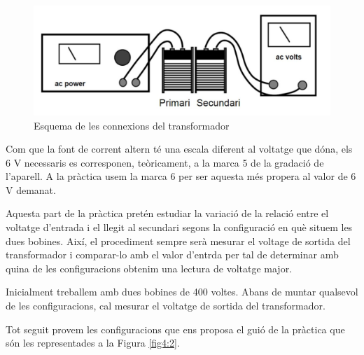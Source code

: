 \documentclass[a4paper,10.5pt]{report}
\begin{document}
\begin{figure}[h]
	\centering
	\includegraphics[width=0.38\linewidth]{screenshot007}
	\caption{Esquema de les connexions del transformador}
	\label{fig4:1}
\end{figure}

Com que la font de corrent altern té una escala diferent al voltatge que dóna, els 6 V necessaris es corresponen, teòricament, a la marca 5 de la gradació de l'aparell. A la pràctica usem la marca 6 per ser aquesta més propera al valor de 6 V demanat.

Aquesta part de la pràctica pretén estudiar la variació de la relació entre el voltatge d'entrada i el llegit al secundari segons la configuració en què situem les dues bobines. Així, el procediment sempre serà mesurar el voltage de sortida del transformador i comparar-lo amb el valor d'entrda per tal de determinar amb quina de les configuracions obtenim una lectura de voltatge major.

Inicialment treballem amb dues bobines de 400 voltes. Abans de muntar qualsevol de les configuracions, cal mesurar el voltatge de sortida del transformador.

Tot seguit provem les configuracions que ens proposa el guió de la pràctica que són les representades a la Figura \ref{fig4:2}.
\end{document}
